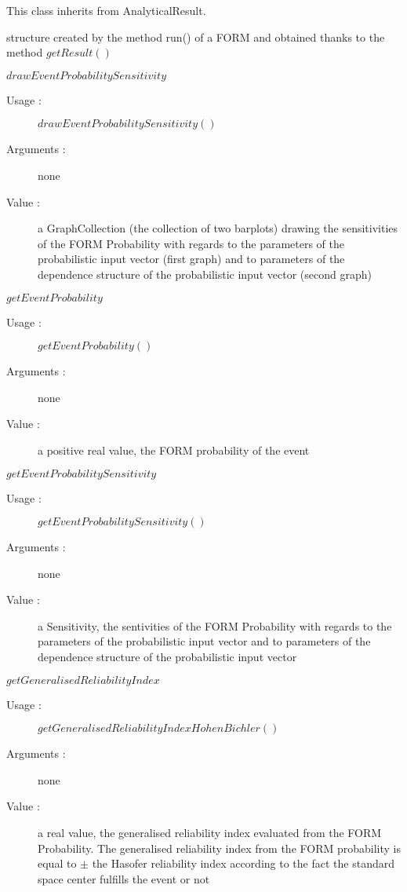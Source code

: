 This class inherits from AnalyticalResult.

\begin{description}

\item[Usage :] structure created by the method run() of a FORM and obtained thanks to the method $getResult()$

\item[Some methods :]  \rule{0pt}{1em}

  \begin{description}

  \item $drawEventProbabilitySensitivity$
    \begin{description}
    \item[Usage :] $drawEventProbabilitySensitivity()$
    \item[Arguments :] none
    \item[Value :]  a GraphCollection (the collection of two barplots) drawing the sensitivities of the FORM Probability with regards to the parameters of the probabilistic input vector (first graph) and to parameters of the dependence structure of the probabilistic input vector (second graph)
    \end{description}
    \bigskip

  \item $getEventProbability$
    \begin{description}
    \item[Usage :] $getEventProbability()$
    \item[Arguments :] none
    \item[Value :]  a positive real value, the FORM probability of the event
    \end{description}
    \bigskip

  \item $getEventProbabilitySensitivity$
    \begin{description}
    \item[Usage :] $getEventProbabilitySensitivity()$
    \item[Arguments :] none
    \item[Value :]  a Sensitivity, the sentivities of the FORM Probability with regards to the parameters of the probabilistic input vector and to parameters of the dependence structure of the probabilistic input vector
    \end{description}
    \bigskip

  \item $getGeneralisedReliabilityIndex$
    \begin{description}
    \item[Usage :] $getGeneralisedReliabilityIndexHohenBichler()$
    \item[Arguments :] none
    \item[Value :]  a  real value, the generalised reliability index evaluated from the FORM Probability. The generalised reliability index from the FORM probability is equal to $\pm$ the Hasofer reliability index according to the fact the standard space center fulfills the event or not
    \end{description}


\end{description}
\end{description}
